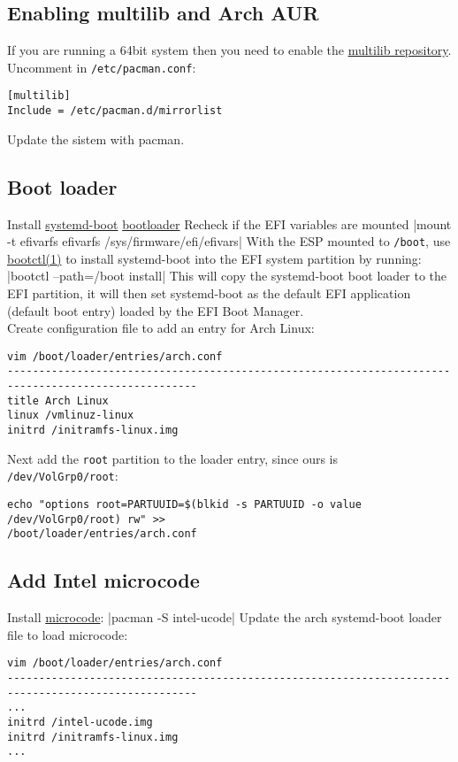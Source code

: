\documentclass[11pt,A4]{article}
\newcommand{\linecode}[1]{ \mint[fontsize=\small,bgcolor=ArchCode,frame=single]{bash}|#1|}
\begin{document}
\vspace{-7mm}
\subsection{Enabling multilib and Arch AUR}
If you are running a 64bit system then you need to enable the \href{https://wiki.archlinux.org/index.php/Official_repositories#multilib}{multilib repository}.\\
Uncomment in \texttt{/etc/pacman.conf}: 
\begin{verbatim}
[multilib]
Include = /etc/pacman.d/mirrorlist
\end{verbatim}
Update the sistem with pacman.

\subsection{Boot loader}
Install \href{https://wiki.archlinux.org/index.php/Systemd-boot}{systemd-boot} \href{https://wiki.archlinux.org/index.php/Boot_loader}{bootloader}
Recheck if the EFI variables are mounted
\linecode{mount -t efivarfs efivarfs /sys/firmware/efi/efivars}
With the ESP mounted to \texttt{/boot}, use \href{https://jlk.fjfi.cvut.cz/arch/manpages/man/bootctl.1}{bootctl(1)} to install systemd-boot into the EFI system partition by running:
\linecode{bootctl --path=/boot install}
This will copy the systemd-boot boot loader to the EFI partition, it will then set systemd-boot as the default EFI application (default boot entry) loaded by the EFI Boot Manager.\\
Create configuration file to add an entry for Arch Linux:
\begin{verbatim}
vim /boot/loader/entries/arch.conf
----------------------------------------------------------------------------------------------------
title Arch Linux
linux /vmlinuz-linux
initrd /initramfs-linux.img
\end{verbatim}
Next add the \texttt{root} partition to the loader entry, since ours is \texttt{/dev/VolGrp0/root}:
\begin{verbatim}
echo "options root=PARTUUID=$(blkid -s PARTUUID -o value /dev/VolGrp0/root) rw" >>
/boot/loader/entries/arch.conf
\end{verbatim}

\subsection{Add Intel microcode}
Install \href{https://wiki.archlinux.org/index.php/Microcode}{microcode}:
\linecode{pacman -S intel-ucode}
Update the arch systemd-boot loader file to load microcode:
\begin{verbatim}
vim /boot/loader/entries/arch.conf
----------------------------------------------------------------------------------------------------
...
initrd /intel-ucode.img
initrd /initramfs-linux.img
...
\end{verbatim}
\end{document}
